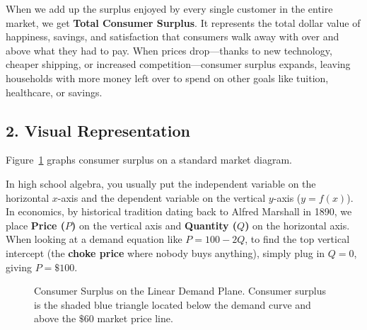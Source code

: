 \documentclass[11pt,letterpaper]{article}
\begin{document}
When we add up the surplus enjoyed by every single customer in the entire market, we get \textbf{Total Consumer Surplus}. It represents the total dollar value of happiness, savings, and satisfaction that consumers walk away with over and above what they had to pay. When prices drop—thanks to new technology, cheaper shipping, or increased competition—consumer surplus expands, leaving households with more money left over to spend on other goals like tuition, healthcare, or savings.

\subsection*{2. Visual Representation}
Figure~\ref{fig:consumer_surplus} graphs consumer surplus on a standard market diagram. 

\begin{tcolorbox}[colback=yellow!10!white,colframe=orange!80!black,title=\textbf{Graphing Tip: Why is Price on the Vertical Y-Axis?}]
In high school algebra, you usually put the independent variable on the horizontal $x$-axis and the dependent variable on the vertical $y$-axis ($y = f(x)$). In economics, by historical tradition dating back to Alfred Marshall in 1890, we place \textbf{Price ($P$)} on the vertical axis and \textbf{Quantity ($Q$)} on the horizontal axis. When looking at a demand equation like $P = 100 - 2Q$, to find the top vertical intercept (the \textbf{choke price} where nobody buys anything), simply plug in $Q = 0$, giving $P = \$100$.
\end{tcolorbox}

\begin{figure}[htbp]
\centering
{}
\caption{Consumer Surplus on the Linear Demand Plane. Consumer surplus is the shaded blue triangle located below the demand curve and above the $\$60$ market price line.}
\label{fig:consumer_surplus}
\end{figure}
\end{document}
